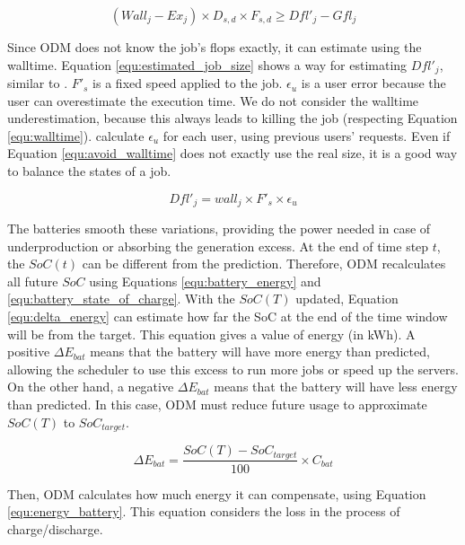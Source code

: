 \begin{equation}
    (Wall_j - Ex_j) \times D_{s,d} \times F_{s,d} \ge Dfl'_j - Gfl_j
    \label{equ:avoid_walltime}
\end{equation}

Since ODM does not know the job's flops exactly, it can estimate using the walltime. Equation \ref{equ:estimated_job_size} shows a way for estimating $Dfl'_j$, similar to \cite{takizawa2020effect}. $F'_{s}$ is a fixed speed applied to the job. $\epsilon_{u}$ is a user error because the user can overestimate the execution time. We do not consider the walltime underestimation, because this always leads to killing the job (respecting Equation \ref{equ:walltime}). \citeauthor{takizawa2020effect} calculate $\epsilon_{u}$ for each user, using previous users' requests. Even if Equation \ref{equ:avoid_walltime} does not exactly use the real size, it is a good way to balance the states of a job.

\begin{equation}
    \label{equ:estimated_job_size}
    Dfl'_j = wall_j \times F'_{s} \times \epsilon_{u}
\end{equation}

The batteries smooth these variations, providing the power needed in case of underproduction or absorbing the generation excess. At the end of time step $t$, the $SoC(t)$ can be different from the prediction. Therefore, ODM recalculates all future $SoC$ using Equations \ref{equ:battery_energy} and \ref{equ:battery_state_of_charge}. With the $SoC(T)$ updated, Equation \ref{equ:delta_energy} can estimate how far the SoC at the end of the time window will be from the target. This equation gives a value of energy (in kWh). A positive $\Delta E_{bat}$ means that the battery will have more energy than predicted, allowing the scheduler to use this excess to run more jobs or speed up the servers. On the other hand, a negative $\Delta E_{bat}$ means that the battery will have less energy than predicted. In this case, ODM must reduce future usage to approximate $SoC(T)$ to $SoC_{target}$.

\begin{equation}
    \label{equ:delta_energy}
    \Delta E_{bat} = \frac{SoC(T) - SoC_{target}}{100}\times C_{bat}
\end{equation}

Then, ODM calculates how much energy it can compensate, using Equation \ref{equ:energy_battery}. This equation considers the loss in the process of charge/discharge. 

